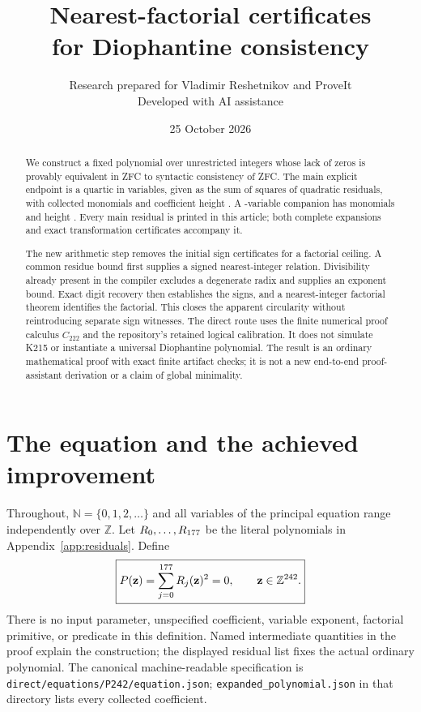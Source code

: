 \documentclass[11pt,letterpaper]{article}
\title{Nearest-factorial certificates\\for Diophantine consistency}
\author{Research prepared for Vladimir Reshetnikov and ProveIt\\\small Developed with AI assistance}
\date{25 October 2026}
\theoremstyle{remark}\newtheorem{remark}[theorem]{Remark}
\newcommand{\Z}{\mathbb Z}\newcommand{\N}{\mathbb N}
\begin{document}
\maketitle
\begin{abstract}
We construct a fixed polynomial over unrestricted integers whose lack of zeros is provably equivalent in ZFC to syntactic consistency of ZFC. The main explicit endpoint is a quartic in \MainVariables{} variables, given as the sum of squares of \MainRows{} quadratic residuals, with \MainTerms{} collected monomials and coefficient height \MainHeight{}. A \BalancedVariables{}-variable companion has \BalancedTerms{} monomials and height \BalancedHeight{}. Every main residual is printed in this article; both complete expansions and exact transformation certificates accompany it.

The new arithmetic step removes the initial sign certificates for a factorial ceiling. A common residue bound first supplies a signed nearest-integer relation. Divisibility already present in the compiler excludes a degenerate radix and supplies an exponent bound. Exact digit recovery then establishes the signs, and a nearest-integer factorial theorem identifies the factorial. This closes the apparent circularity without reintroducing separate sign witnesses. The direct route uses the finite numerical proof calculus $C_{222}$ and the repository's retained logical calibration. It does not simulate K215 or instantiate a universal Diophantine polynomial. The result is an ordinary mathematical proof with exact finite artifact checks; it is not a new end-to-end proof-assistant derivation or a claim of global minimality.
\end{abstract}
\setcounter{tocdepth}{1}
\begingroup\small\setlength{\parskip}{0pt}
\tableofcontents
\endgroup
\newpage

\section{The equation and the achieved improvement}
\label{sec:result}
Throughout, $\N=\{0,1,2,\ldots\}$ and all variables of the principal equation range independently over $\Z$. Let $R_0,\ldots,R_{177}$ be the literal polynomials in Appendix~\ref{app:residuals}. Define
\begin{equation}\label{eq:principal}
 \boxed{P(\mathbf z)=\sum_{j=0}^{\LastRow}R_j(\mathbf z)^2=0,
 \qquad \mathbf z\in\Z^{\MainVariables}.}
\end{equation}
There is no input parameter, unspecified coefficient, variable exponent, factorial primitive, or predicate in this definition. Named intermediate quantities in the proof explain the construction; the displayed residual list fixes the actual ordinary polynomial. The canonical machine-readable specification is \texttt{direct/equations/P242/equation.json}; \texttt{expanded\_polynomial.json} in that directory lists every collected coefficient.
\end{document}
